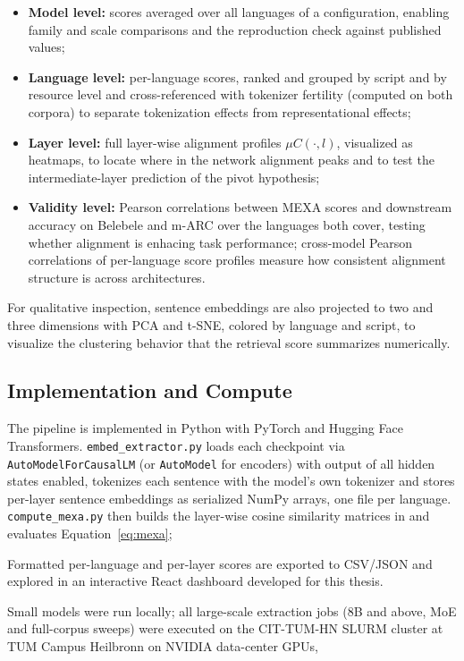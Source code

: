 \begin{itemize}
    \item \textbf{Model level:} scores averaged over all languages of a
    configuration, enabling family and scale comparisons and the
    reproduction check against published values;
    \item \textbf{Language level:} per-language scores, ranked and grouped
    by script and by resource level and cross-referenced with tokenizer
    fertility (computed on both corpora) to separate tokenization effects
    from representational effects;
    \item \textbf{Layer level:} full layer-wise alignment profiles
    $\mu C(\cdot, l)$, visualized as heatmaps, to locate where in the
    network alignment peaks and to test the intermediate-layer prediction
    of the pivot hypothesis;
    \item \textbf{Validity level:} Pearson correlations between MEXA
    scores and downstream accuracy on Belebele
    \citep{bandarkar2024belebele} and m-ARC \citep{lai2023okapi} over the
    languages both cover, testing whether alignment is enhacing
    task performance; cross-model Pearson correlations of per-language score profiles  measure how consistent alignment
    structure is across architectures.
\end{itemize}

For qualitative inspection, sentence embeddings are also projected to two and three dimensions with PCA and t-SNE, colored by language and script,
to visualize the clustering behavior that the retrieval score summarizes
numerically.

\subsection{Implementation and Compute}
\label{subsec:implementation}

The pipeline is implemented in Python with PyTorch and Hugging Face
Transformers. \texttt{embed\_extractor.py} loads each checkpoint via
\texttt{AutoModelForCausalLM} (or \texttt{AutoModel} for encoders) with
output of all hidden states enabled, tokenizes each sentence with the
model's own tokenizer and stores per-layer sentence embeddings as
serialized NumPy arrays, one file per language.
\texttt{compute\_mexa.py} then builds the layer-wise cosine similarity
matrices in  and evaluates Equation~\eqref{eq:mexa}; 

Formatted per-language and per-layer scores are
exported to CSV/JSON and explored in an interactive React dashboard developed for this thesis.

Small models were run locally; all large-scale extraction jobs (8B and
above, MoE and full-corpus sweeps) were executed on the CIT-TUM-HN
SLURM cluster at TUM Campus Heilbronn on NVIDIA data-center GPUs, 
